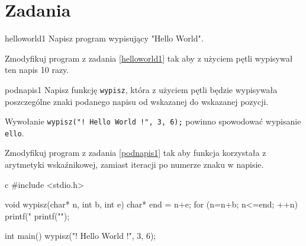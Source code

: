 \documentclass{pdfBooklets}
\begin{document}
\section{Zadania}
\begin{Zadanie}{}{helloworld1}
Napisz program wypisujący "Hello World".
\end{Zadanie}

\begin{Zadanie}{}{}
Zmodyfikuj program z zadania \ref{helloworld1} tak aby z użyciem pętli wypisywał ten napis 10 razy.
\end{Zadanie}

\begin{Zadanie}{}{podnapis1}
Napisz funkcję \Verb#wypisz#, która z użyciem pętli będzie wypisywała poszczególne znaki podanego napisu od wskazanej do wskazanej pozycji.

Wywołanie \Verb#wypisz("! Hello World !", 3, 6);# powinno spowodować wypisanie \Verb#ello#.
\end{Zadanie}

\begin{Zadanie}{}{}
Zmodyfikuj program z zadania \ref{podnapis1} tak aby funkcja korzystała z arytmetyki wskaźnikowej, zamiast iteracji po numerze znaku w napisie.

\begin{rozwiazanie}{c}
#include <stdio.h>

void wypisz(char* n, int b, int e) {
	char* end = n+e;
	for (n=n+b; n<=end; ++n)
		printf("%
	printf("\n");
}

int main(){
	wypisz("! Hello World !", 3, 6);
}
\end{rozwiazanie}
\end{Zadanie}

\end{document}
